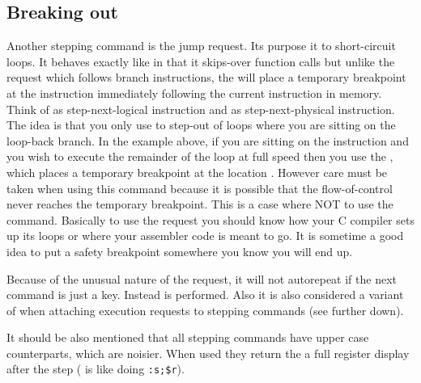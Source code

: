 \subsection{Breaking out}

Another stepping command is the  jump request.  Its purpose
it to short-circuit loops.  It behaves exactly like  in that
it skips-over function calls but unlike the  request which
follows branch instructions, the  will place a temporary
breakpoint at the instruction immediately following the current
instruction in memory.  Think of  as step-next-logical
instruction and  as step-next-physical instruction.  The idea
is that you only use  to step-out of loops where you are
sitting on the loop-back branch.
In the example above, if you are sitting on the  instruction and you
wish to execute the remainder of the loop at full speed then you use the
, which places a temporary breakpoint at the location .
However care
must be taken when using this command because it is possible that the 
flow-of-control never reaches the temporary breakpoint.
This is a case where NOT to use the  command. 
Basically to use the 
request you should know how your C compiler sets up its loops or where your
assembler code is meant to go. It is sometime a good idea to put a safety
breakpoint somewhere you know you will end up.

Because of the unusual nature of the  request,
it will not autorepeat if the next command is just a  key. 
Instead  is performed. Also it is
also considered a variant of  when attaching execution requests to
stepping commands (see further down).

It should be also mentioned that all stepping commands have upper case
counterparts, which are noisier. When used they return the a full register
display after the step ( is like doing \verb|:s;$r|).
